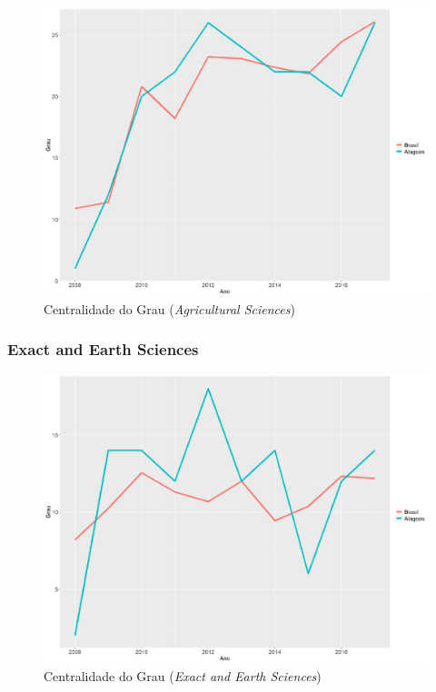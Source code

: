 \begin{figure}[H]
	\centering
	\includegraphics[scale=0.6]{Imagens/agricultural/graf-linha-degree-br-al.pdf}
	\caption{Centralidade do Grau (\textit{Agricultural Sciences})}
	\label{degree-agri}
\end{figure}

\subsubsection{Exact and Earth Sciences}

\begin{figure}[H]
	\centering
	\includegraphics[scale=0.6]{Imagens/exact/graf-linha-degree-br-al.pdf}
	\caption{Centralidade do Grau (\textit{Exact and Earth Sciences})}
	\label{degree-exact}
\end{figure}

